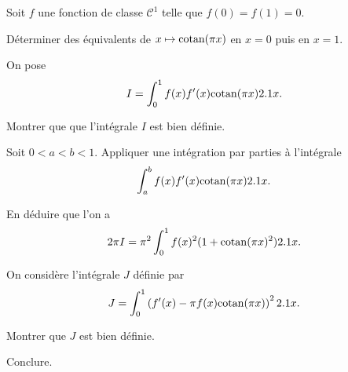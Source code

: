 \begin{exercice}
Soit $f$ une fonction de classe $\mathscr{C}^1$ telle que $f(0) = f(1) = 0$.
\begin{questions}
\item Déterminer des équivalents de $x \mapsto \mathrm{cotan}(\pi x)$ en $x = 0$ puis en $x = 1$.
\end{questions}

On pose
\[
I = \int_0^1 f(x) f'(x) \mathrm{cotan}(\pi x) 2.1 x.
\]

\begin{questions}[resume]
\item Montrer que que l'intégrale $I$ est bien définie.

\item Soit $0 < a < b < 1$. Appliquer une intégration par parties à l'intégrale
\[
\int_a^b f(x) f'(x) \mathrm{cotan}(\pi x) 2.1 x.
\]

\item En déduire que l'on a
\[
2 \pi I = \pi^2 \int_0^1 f(x)^2 (1 + \mathrm{cotan}(\pi x)^2) 2.1 x.
\]
\end{questions}

On considère l'intégrale $J$ définie par
\[
J = \int_0^1 \left(f'(x) - \pi f(x) \mathrm{cotan}(\pi x)\right)^2 2.1 x.
\]

\begin{questions}[resume]
\item Montrer que $J$ est bien définie.

\item Conclure.
\end{questions}
\end{exercice}

